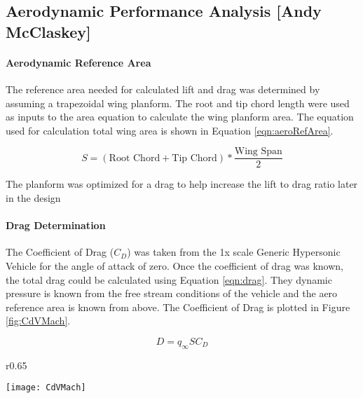 \subsection{Aerodynamic Performance Analysis [Andy McClaskey]}
\paragraph{Aerodynamic Reference Area}
The reference area needed for calculated lift and drag was determined by assuming a trapezoidal wing planform. The root and tip chord length were used as inputs to the area equation to calculate the wing planform area. The equation used for calculation total wing area is shown in Equation \ref{eqn:aeroRefArea}.

\begin{equation}
\label{eqn:aeroRefArea}
S = (\text{Root Chord} + \text{Tip Chord})*\frac{\text{Wing Span}}{2}
\end{equation}

The planform was optimized for a drag to help increase the lift to drag ratio later in the design

\paragraph{Drag Determination}

The Coefficient of Drag ($C_D$) was taken from the 1x scale Generic Hypersonic Vehicle \cite{ghv} for the angle of attack of zero. Once the coefficient of drag was known, the total drag could be calculated using Equation \ref{eqn:drag}. They dynamic pressure is known from the free stream conditions of the vehicle and the aero reference area is known from above. The Coefficient of Drag is plotted in Figure \ref{fig:CdVMach}.

\begin{equation}
\label{eqn:drag}
D = q_{\infty}SC_D
\end{equation}

\begin{wrapfigure}{r}{0.65\textwidth}
\begin{center}
\texttt{[image: CdVMach]}
\caption{$C_D$ v. Mach}
\label{fig:CdVMach}
\end{center}
\end{wrapfigure}

\begin{comment}
The total drag for the vehicle is shown in Figure \ref{fig:dragVMach}.

\begin{wrapfigure}{r}{0.65\textwidth}
\begin{center}
\texttt{[image: dragVMach]}
\caption{Drag v. Mach}
\label{fig:dragVMach}
\end{center}
\end{wrapfigure}

\end{comment}

